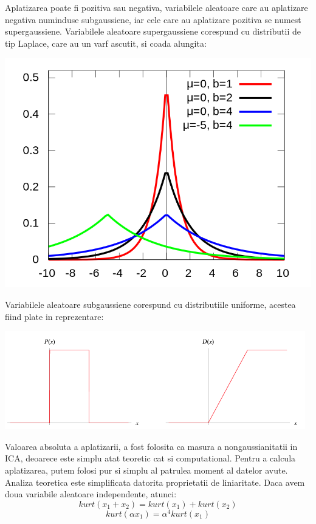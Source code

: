 \documentclass[12pt]{article}
\begin{document}
Aplatizarea poate fi pozitiva sau negativa, variabilele aleatoare care au aplatizare negativa numinduse subgaussiene, iar cele care au aplatizare pozitiva se numest supergaussiene. Variabilele aleatoare supergaussiene corespund cu distributii de tip Laplace, care au un varf ascutit, si coada alungita:
\begin{center}
	\includegraphics[scale=0.5]{laplace_distribution}
 \end{center}

 Variabilele aleatoare subgaussiene corespund cu distributiile uniforme, acestea fiind plate in reprezentare:

\begin{center}
	\includegraphics[scale=1.2]{uniform_distribution}
 \end{center}

Valoarea absoluta a aplatizarii, a fost folosita ca masura a nongaussianitatii in ICA, deoarece este simplu atat teoretic cat si computational. Pentru a calcula aplatizarea, putem folosi pur si simplu al patrulea moment al datelor avute. Analiza teoretica este simplificata datorita proprietatii de liniaritate. Daca avem doua variabile aleatoare independente, atunci:
\begin{equation}
kurt(x_1+x_2)=kurt(x_1)	+ kurt(x_2)
\end{equation}
\begin{equation}
kurt(\alpha x_1)=\alpha^4kurt(x_1)
\end{equation}
\end{document}
